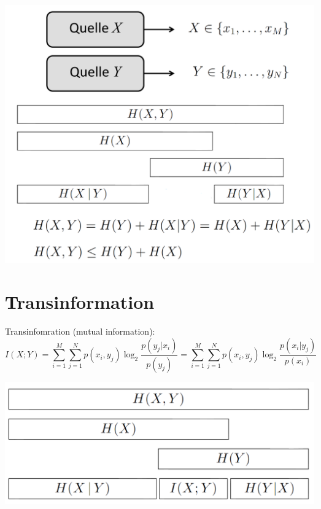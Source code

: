 \begin{center}
	\includegraphics[width=.9\textwidth]{./images/verbundentro.png}
\end{center}

\section{Transinformation}
Transinfomration (mutual information):
\[ I(X;Y) = \sum_{i=1}^{M}\sum_{j=1}^{N}p(x_i,y_j)\log_2\frac{p(y_j|x_i)}{p(y_j)}
	= \sum_{i=1}^{M}\sum_{j=1}^{N}p(x_i,y_j)\log_2\frac{p(x_i|y_j)}{p(x_i)} \]
	
\begin{center}
	\includegraphics[width=.9\textwidth]{./images/transinfo.png}
\end{center}

